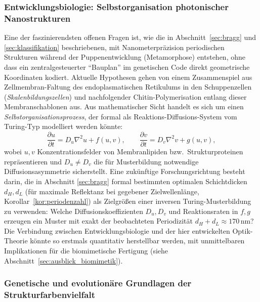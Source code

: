 ﻿\documentclass[a4paper,12pt]{article}
\theoremstyle{definition}
\begin{document}
	\subsubsection{Entwicklungsbiologie: Selbstorganisation photonischer Nanostrukturen}

	Eine der faszinierendsten offenen Fragen ist, wie die in
	Abschnitt~\ref{sec:bragg} und \ref{sec:klassifikation} beschriebenen,
	mit Nanometerpräzision periodischen Strukturen während der
	Puppenentwicklung (Metamorphose) entstehen, ohne dass ein
	zentralgesteuerter ``Bauplan'' im genetischen Code direkt
	geometrische Koordinaten kodiert. Aktuelle Hypothesen gehen von
	einem Zusammenspiel aus Zellmembran-Faltung des endoplasmatischen
	Retikulums in den Schuppenzellen (\textit{Skalenbildungszellen})
	und nachfolgender Chitin-Polymerisation entlang dieser Membranschablonen
	aus. Aus mathematischer Sicht handelt es sich um einen
	\emph{Selbstorganisationsprozess}, der formal als
	Reaktions-Diffusions-System vom Turing-Typ modelliert werden könnte:
	\[
	\frac{\partial u}{\partial t} = D_u \nabla^2 u + f(u,v), \qquad
	\frac{\partial v}{\partial t} = D_v \nabla^2 v + g(u,v),
	\]
	wobei $u,v$ Konzentrationsfelder von Membranlipiden bzw.\
	Strukturproteinen repräsentieren und $D_u \ne D_v$ die für
	Musterbildung notwendige Diffusionsasymmetrie sicherstellt. Eine
	zukünftige Forschungsrichtung besteht darin, die in Abschnitt
	\ref{sec:bragg} formal bestimmten optimalen Schichtdicken $d_H,d_L$
	(für maximale Reflektanz bei gegebener Zielwellenlänge,
	Korollar~\ref{kor:periodenzahl}) als Zielgrößen einer inversen
	Turing-Musterbildung zu verwenden: Welche Diffusionskoeffizienten
	$D_u,D_v$ und Reaktionsraten in $f,g$ erzeugen ein Muster mit exakt der
	beobachteten Periodizität $d_H+d_L\approx 170$\,nm? Die Verbindung
	zwischen Entwicklungsbiologie und der hier entwickelten Optik-Theorie
	könnte so erstmals quantitativ herstellbar werden, mit unmittelbaren
	Implikationen für die biomimetische Fertigung (siehe
	Abschnitt~\ref{sec:ausblick_biomimetik}).

	\subsubsection{Genetische und evolutionäre Grundlagen der Strukturfarbenvielfalt}
	\label{sec:ausblick_genetik}
\end{document}
